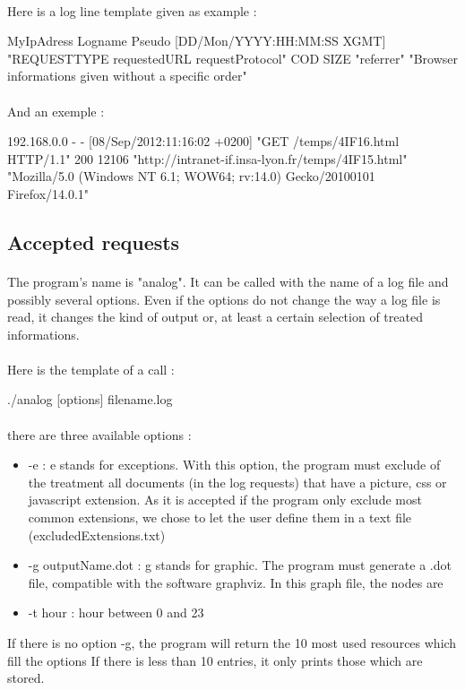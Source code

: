 \documentclass[a4paper, 12pts]{article}
\begin{document}
\paragraph{}
 Here is a log line template given as example :

 MyIpAdress Logname Pseudo [DD/Mon/YYYY:HH:MM:SS XGMT] "REQUESTTYPE requestedURL requestProtocol" COD SIZE "referrer" "Browser informations given without a specific order"

\paragraph{}
 And an exemple :

 192.168.0.0 - - [08/Sep/2012:11:16:02 +0200] "GET /temps/4IF16.html HTTP/1.1" 200 12106 "http://intranet-if.insa-lyon.fr/temps/4IF15.html" "Mozilla/5.0 (Windows NT 6.1; WOW64; rv:14.0) Gecko/20100101 Firefox/14.0.1"
 
\subsection{Accepted requests}
\paragraph{}
 The program's name is "analog". It can be called with the name of a log file and possibly several options. Even if the options do not change the way a log file is read, it changes the kind of output or, at least a certain selection of treated informations.
\paragraph{} 
Here is the template of a call :
 
./analog [options] filename.log
\paragraph{} 
 there are three available options :
 \begin{itemize}[label=$\square$]
 \item -e : e stands for exceptions. With this option, the program must exclude of the treatment all documents (in the log requests) that have a picture, css or javascript extension. As it is accepted if the program only exclude most common extensions, we chose to let the user define them in a text file (excludedExtensions.txt)
 \item -g outputName.dot : g stands for graphic. The program must generate a .dot file, compatible with the software graphviz. In this graph file, the nodes are
 \item -t hour : hour between 0 and 23
 \end{itemize}
 If there is no option -g, the program will return the 10 most used resources which fill the options
 If there is less than 10 entries, it only prints those which are stored.
\end{document}
